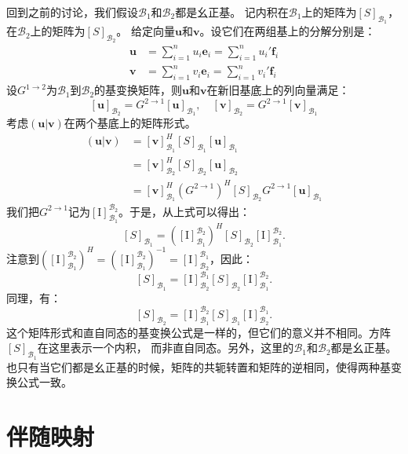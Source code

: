 \documentclass[12pt,UTF8,fontset=none]{ctexbook}
\begin{document}
回到之前的讨论，我们假设$\mathcal{B}_1$和$\mathcal{B}_2$都是幺正基。
记内积在$ \mathcal{B}_1$上的矩阵为$[S]_{\mathcal{B}_1}$，在$ \mathcal{B}_2$上的矩阵为$[S]_{\mathcal{B}_2} $。
给定向量$\mathbf{u}$和$\mathbf{v}$。设它们在两组基上的分解分别是：
\begin{align*}
    \mathbf{u} &= \sum_{i=1}^n u_i \mathbf{e}_i = \sum_{i=1}^n u_i' \mathbf{f}_i  \\
    \mathbf{v} &= \sum_{i=1}^n v_i \mathbf{e}_i = \sum_{i=1}^n v_i' \mathbf{f}_i  
\end{align*}
设$G^{1\rightarrow 2}$为$\mathcal{B}_1$到$\mathcal{B}_2$的基变换矩阵，则$\mathbf{u}$和$\mathbf{v}$在新旧基底上的列向量满足：
$$ [\mathbf{u}]_{\mathcal{B}_2} = G^{2\rightarrow 1} [\mathbf{u}]_{\mathcal{B}_1}, \quad [\mathbf{v}]_{\mathcal{B}_2} = G^{2\rightarrow 1} [\mathbf{v}]_{\mathcal{B}_1} $$
考虑$ ( \mathbf{u} |  \mathbf{v} )$在两个基底上的矩阵形式。
\begin{align*}
    ( \mathbf{u} |  \mathbf{v} ) &= [\mathbf{v}]_{\mathcal{B}_1}^H [S]_{\mathcal{B}_1} [\mathbf{u}]_{\mathcal{B}_1}  \\
    &= [\mathbf{v}]_{\mathcal{B}_2}^H [S]_{\mathcal{B}_2} [\mathbf{u}]_{\mathcal{B}_2}  \\
    &= [\mathbf{v}]_{\mathcal{B}_1}^H \left(G^{2 \rightarrow 1}\right)^H [S]_{\mathcal{B}_2} G^{2 \rightarrow 1} [\mathbf{u}]_{\mathcal{B}_1}  
\end{align*}
我们把$G^{2\rightarrow 1}$记为$[\mathrm{I}]_{\mathcal{B}_1}^{\mathcal{B}_2}$。于是，从上式可以得出：
$$[S]_{\mathcal{B}_1} = \left([\mathrm{I}]_{\mathcal{B}_1}^{\mathcal{B}_2}\right)^H [S]_{\mathcal{B}_2} [\mathrm{I}]_{\mathcal{B}_1}^{\mathcal{B}_2}.$$
注意到$ \left([\mathrm{I}]_{\mathcal{B}_1}^{\mathcal{B}_2}\right)^H = \left([\mathrm{I}]_{\mathcal{B}_1}^{\mathcal{B}_2}\right)^{-1} = [\mathrm{I}]_{\mathcal{B}_2}^{\mathcal{B}_1}$，因此：
$$[S]_{\mathcal{B}_1} = [\mathrm{I}]_{\mathcal{B}_2}^{\mathcal{B}_1} [S]_{\mathcal{B}_2} [\mathrm{I}]_{\mathcal{B}_1}^{\mathcal{B}_2}.$$
同理，有：
$$[S]_{\mathcal{B}_2} = [\mathrm{I}]_{\mathcal{B}_1}^{\mathcal{B}_2} [S]_{\mathcal{B}_1} [\mathrm{I}]_{\mathcal{B}_2}^{\mathcal{B}_1}.$$
这个矩阵形式和直自同态的基变换公式是一样的，但它们的意义并不相同。方阵$[S]_{\mathcal{B}_1}$在这里表示一个内积，
而非直自同态。另外，这里的$\mathcal{B}_1$和$\mathcal{B}_2$都是幺正基。
也只有当它们都是幺正基的时候，矩阵的共轭转置和矩阵的逆相同，使得两种基变换公式一致。

\section{伴随映射}
\end{document}
